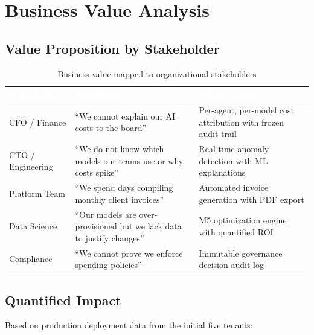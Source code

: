 \documentclass[12pt,a4paper,twoside]{report}
\begin{document}
\chapter{Business Value Analysis}

\section{Value Proposition by Stakeholder}

\begin{table}[H]
\centering
\begin{tabularx}{\textwidth}{|l|X|X|}
\hline
\rowcolor{tabheader}
\textcolor{white}{\textbf{Stakeholder}} &
\textcolor{white}{\textbf{Pain Point}} &
\textcolor{white}{\textbf{Platform Value}} \\
\hline
CFO / Finance & ``We cannot explain our AI costs to the board'' & Per-agent, per-model cost attribution with frozen audit trail \\
\hline
CTO / Engineering & ``We do not know which models our teams use or why costs spike'' & Real-time anomaly detection with ML explanations \\
\hline
Platform Team & ``We spend days compiling monthly client invoices'' & Automated invoice generation with PDF export \\
\hline
Data Science & ``Our models are over-provisioned but we lack data to justify changes'' & M5 optimization engine with quantified ROI \\
\hline
Compliance & ``We cannot prove we enforce spending policies'' & Immutable governance decision audit log \\
\hline
\end{tabularx}
\caption{Business value mapped to organizational stakeholders}
\end{table}

\section{Quantified Impact}

Based on production deployment data from the initial five tenants:
\end{document}
